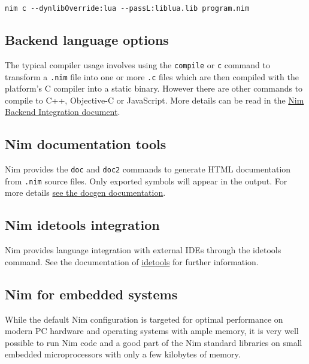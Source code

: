 \begin{verbatim}
nim c --dynlibOverride:lua --passL:liblua.lib program.nim
\end{verbatim}

\hypertarget{backend-language-options}{%
\subsection{Backend language options}\label{backend-language-options}}

The typical compiler usage involves using the \texttt{compile} or
\texttt{c} command to transform a \texttt{.nim} file into one or more
\texttt{.c} files which are then compiled with the platform's C compiler
into a static binary. However there are other commands to compile to
C++, Objective-C or JavaScript. More details can be read in the
\href{backends.html}{Nim Backend Integration document}.

\hypertarget{nim-documentation-tools}{%
\subsection{Nim documentation tools}\label{nim-documentation-tools}}

Nim provides the \texttt{doc} and \texttt{doc2} commands to generate
HTML documentation from \texttt{.nim} source files. Only exported
symbols will appear in the output. For more details
\href{docgen.html}{see the docgen documentation}.

\hypertarget{nim-idetools-integration}{%
\subsection{Nim idetools integration}\label{nim-idetools-integration}}

Nim provides language integration with external IDEs through the
idetools command. See the documentation of
\href{idetools.html}{idetools} for further information.

\hypertarget{nim-for-embedded-systems}{%
\subsection{Nim for embedded systems}\label{nim-for-embedded-systems}}

While the default Nim configuration is targeted for optimal performance
on modern PC hardware and operating systems with ample memory, it is
very well possible to run Nim code and a good part of the Nim standard
libraries on small embedded microprocessors with only a few kilobytes of
memory.

